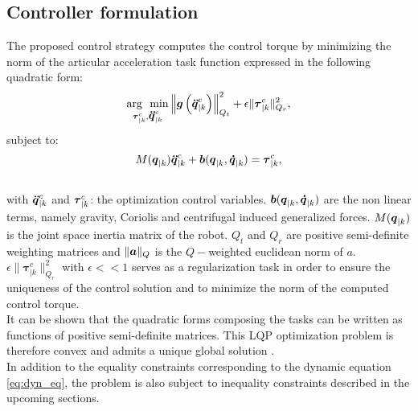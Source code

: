 \subsection{Controller formulation}
\label{subsec:cntrl_frm}
The proposed control strategy computes the control torque by minimizing the norm of the articular acceleration task function expressed in the following quadratic form: 
\begin{equation}
\operatorname*{arg~~min} \limits_{\boldsymbol{\tau}_{|k}^{c}, \mbox{\boldmath${\ddot{q}}$}_{|k}^{c}}  \left\| \mbox{\boldmath${g}$}\left(\mbox{\boldmath${\ddot{q}}$}_{|k}^{c}\right) \right\|_{Q_t}^2 + \epsilon  \| \boldsymbol{\tau}_{|k}^{c} \|_{Q_r}^2,
\label{eq:ctrl_pb}
\end{equation}
subject to:
\begin{equation}
M(\mbox{\boldmath${q}$}_{|k}) \mbox{\boldmath${\ddot{q}}$}_{|k}^{c} + \mbox{\boldmath${b}$}(\mbox{\boldmath${q}$}_{|k},\mbox{\boldmath${\dot{q}}$}_{|k}) = \mbox{\boldmath${\tau}$}_{|k}^{c},
\label{eq:dyn_eq}
\end{equation}
\\
with $\mbox{\boldmath${\ddot{q}}$}_{|k}^{c}$ and $\mbox{\boldmath${\tau}$}_{|k}^{c}$: the optimization control variables.
$\mbox{\boldmath${b}$}(\mbox{\boldmath${q}$}_{|k},\mbox{\boldmath${\dot{q}}$}_{|k})$ are the non linear terms, namely gravity, Coriolis and centrifugal induced generalized forces. $M(\mbox{\boldmath${q}$}_{|k})$ is the joint space inertia matrix of the robot. $Q_t$ and $Q_r$ are  positive semi-definite weighting matrices and $\| \mbox{\boldmath${a}$} \|_{Q}$ is the $Q-$weighted euclidean norm of $a$. $\epsilon  \| \boldsymbol{\tau}_{|k}^{c} \|_{Q_r}^2$ with $\epsilon << 1$ serves as a regularization task in order to ensure the uniqueness of the control solution and to minimize the norm of the computed control torque.\\
It can be shown that the quadratic forms composing the tasks can be written as functions of positive semi-definite matrices. This LQP optimization problem is therefore convex and admits a unique global solution \cite{boyd2004}. 
\\ 
In addition to the equality constraints corresponding to the dynamic equation \eqref{eq:dyn_eq}, the problem is also subject to inequality constraints described in the upcoming sections. 
%
